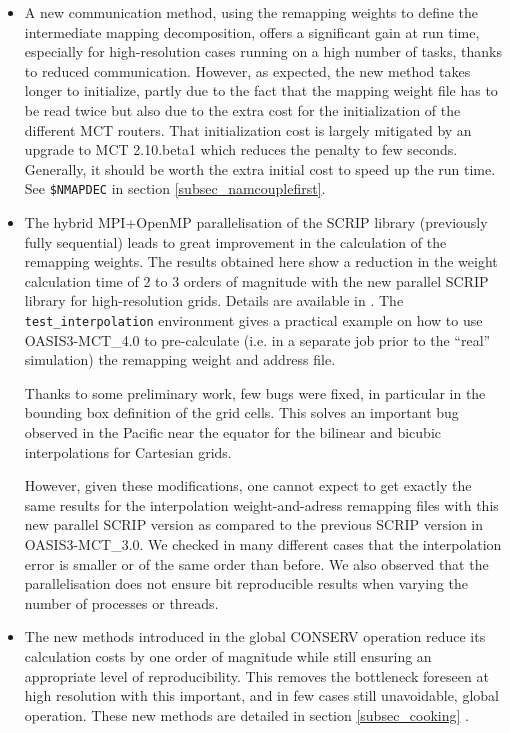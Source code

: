 \begin{itemize}

\item A new communication method, using the remapping weights to define the intermediate mapping decomposition, offers a significant gain at run time, especially for high-resolution cases running on a high number of tasks, thanks to reduced communication. However, as expected, the new method takes longer to initialize, partly due to the fact that the mapping weight file has to be read twice but also due to the extra cost for the initialization of the different MCT routers.  That initialization cost is largely mitigated by an upgrade to MCT 2.10.beta1 which reduces the penalty to few seconds.  Generally, it should be worth the extra initial cost to speed up the run time. See {\tt \$NMAPDEC} in section \ref{subsec_namcouplefirst}.

\item The hybrid MPI+OpenMP parallelisation of the SCRIP library (previously fully sequential) leads to great improvement in the calculation of the remapping weights. The results obtained here show a reduction in the weight calculation time of 2 to 3 orders of magnitude with the new parallel SCRIP library for high-resolution grids. Details are available in \cite{piacentini08}. The {\tt test\_interpolation} environment gives a practical example on how to use OASIS3-MCT\_4.0 to pre-calculate (i.e. in a separate job prior to the “real” simulation) the remapping weight and address file.

Thanks to some preliminary work, few bugs were fixed, in particular in the bounding box definition of the grid cells. This solves an important bug observed in the Pacific near the equator for the bilinear and bicubic interpolations for Cartesian grids.

However, given these modifications, one cannot expect to get exactly the same results for the interpolation weight-and-adress remapping files with this new parallel SCRIP version as compared to the previous SCRIP version in OASIS3-MCT\_3.0. We checked in many different cases that the interpolation error is smaller or of the same order than before. We also observed that the parallelisation does not ensure bit reproducible results when varying the number of processes or threads.

\item The new methods introduced in the global CONSERV operation reduce its calculation costs by one order of magnitude while still ensuring an appropriate level of reproducibility. This removes the bottleneck foreseen at high resolution with this important, and in few cases still unavoidable, global operation. These new methods are detailed in section \ref{subsec_cooking} .

\end{itemize}

